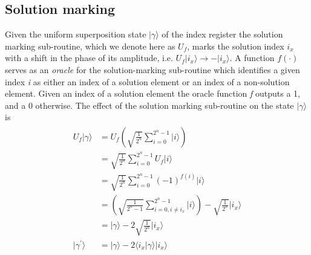 \subsection*{Solution marking}
Given the uniform superposition state $\vert \gamma \rangle$ of the index register the solution marking sub-routine, which we denote here as $U_f$, marks the solution index $i_{x}$ with a shift in the phase of its amplitude, i.e. $U_f\vert i_{x} \rangle \rightarrow -\vert i_{x} \rangle$. A function $f(\cdot)$ serves as an \textit{oracle} for the solution-marking sub-routine which identifies a given index \textit{i} as either an index of a solution element or an index of a non-solution element. Given an index of a solution element the oracle function \textit{f} outputs a 1, and a 0 otherwise. The effect of the solution marking sub-routine on the state $\vert \gamma \rangle$ is
\begin{align}
	\begin{split}
		U_f\vert \gamma \rangle &= U_f\left( \sqrt{\frac{1}{2^n}} \sum_{i=0}^{2^n-1} \vert i \rangle \right)\\
		&= \sqrt{\frac{1}{2^n}} \sum_{i=0}^{2^n-1} U_f\vert i \rangle\\
		&= \sqrt{\frac{1}{2^n}} \sum_{i=0}^{2^n-1} (-1)^{f(i)}\vert i \rangle\\
		&= \left(\sqrt{\frac{1}{2^{n} - 1}} \sum_{i=0, i\neq i_{x}}^{2^n-1} \vert i \rangle \right) - \sqrt{\frac{1}{2^n}} \vert i_{x} \rangle\\
		&= \vert \gamma \rangle - 2\sqrt{\frac{1}{2^n}} \vert i_{x} \rangle\\
		\vert \gamma^{\prime} \rangle &= \vert \gamma \rangle - 2\langle i_{x} \vert \gamma \rangle \vert i_{x} \rangle\\
	\end{split}
\end{align}

